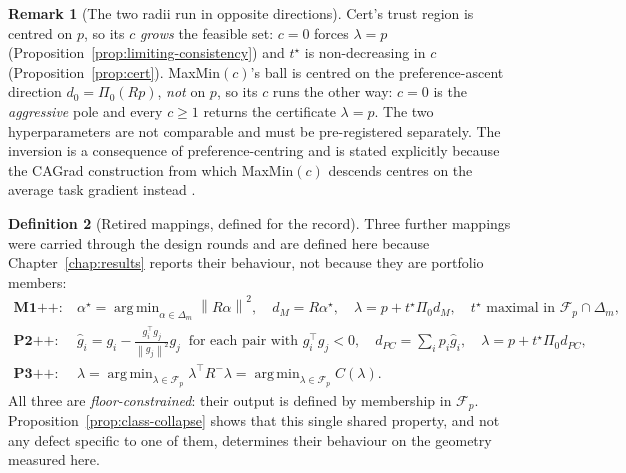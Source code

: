 \documentclass[12pt,a4paper]{report}
\newcommand{\1}{\mathbf{1}}
\newcommand{\norm}[1]{\left\lVert #1 \right\rVert}
\newcommand{\Floor}{\mathcal{F}_{p}}
\newcommand{\Pz}{\Pi_{0}}
\DeclareMathOperator*{\argmin}{arg\,min}
\theoremstyle{definition}
\newtheorem{definition}{Definition}
\newtheorem{remark}[definition]{Remark}
\begin{document}
\begin{remark}[The two radii run in opposite directions]
\label{rem:two-cs}
Cert's trust region is centred on \(p\), so its \(c\) \emph{grows} the feasible set: \(c=0\) forces \(\lambda=p\) (Proposition~\ref{prop:limiting-consistency}) and \(t^\star\) is non-decreasing in \(c\) (Proposition~\ref{prop:cert}). MaxMin\((c)\)'s ball is centred on the preference-ascent direction \(d_0=\Pz(Rp)\), \emph{not} on \(p\), so its \(c\) runs the other way: \(c=0\) is the \emph{aggressive} pole and every \(c\ge1\) returns the certificate \(\lambda=p\). The two hyperparameters are not comparable and must be pre-registered separately. The inversion is a consequence of preference-centring and is stated explicitly because the CAGrad construction from which MaxMin\((c)\) descends centres on the average task gradient instead \citep{liu2021cagrad}.
\end{remark}

\begin{definition}[Retired mappings, defined for the record]
\label{def:retired}
Three further mappings were carried through the design rounds and are defined here because Chapter~\ref{chap:results} reports their behaviour, not because they are portfolio members:
\[
\begin{aligned}
\textbf{M1++}:\ &\alpha^\star=\argmin_{\alpha\in\Delta_m}\norm{R\alpha}^2,\quad d_M=R\alpha^\star,\quad
\lambda=p+t^\star\Pz d_M,\quad t^\star\text{ maximal in }\Floor\cap\Delta_m,\\
\textbf{P2++}:\ &\hat g_i=g_i-\tfrac{g_i^\top g_j}{\norm{g_j}^2}g_j\ \text{ for each pair with } g_i^\top g_j<0,\quad
d_{PC}=\textstyle\sum_i p_i\hat g_i,\quad \lambda=p+t^\star\Pz d_{PC},\\
\textbf{P3++}:\ &\lambda=\argmin_{\lambda\in\Floor}\lambda^\top R^-\lambda=\argmin_{\lambda\in\Floor}C(\lambda).
\end{aligned}
\]
All three are \emph{floor-constrained}: their output is defined by membership in \(\Floor\). Proposition~\ref{prop:class-collapse} shows that this single shared property, and not any defect specific to one of them, determines their behaviour on the geometry measured here.
\end{definition}
\end{document}
